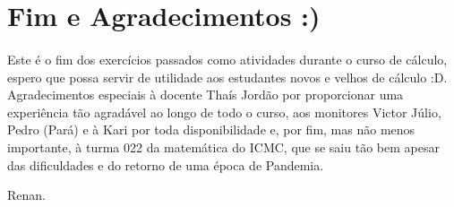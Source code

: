 \documentclass{article}
\begin{document}
\section{Fim e Agradecimentos :)}
\paragraph{} Este \'e o fim dos exerc\'icios passados como atividades durante o curso de c\'alculo, espero que
possa servir de utilidade aos estudantes novos e velhos de c\'alculo :D. Agradecimentos especiais \`a docente
Tha\'is Jord\~ao por proporcionar uma experi\^encia t\~ao agrad\'avel ao longo de todo o curso, aos monitores
Victor J\'ulio, Pedro (Par\'a) e \`a Kari por toda disponibilidade e, por fim, mas n\~ao menos importante, \`a
turma 022 da matem\'atica do ICMC, que se saiu t\~ao bem apesar das dificuldades e do retorno de uma \'epoca de Pandemia.

Renan.
\end{document}
